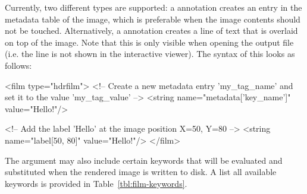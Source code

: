 Currently, two different types are supported: a  annotation
creates an entry in the metadata table of the image, which is preferable
when the image contents should not be touched. Alternatively, a 
annotation creates a line of text that is overlaid on top of the image. Note
that this is only visible when opening the output file (i.e. the line is not
shown in the interactive viewer).
The syntax of this looks as follows:

\begin{xml}
<film type="hdrfilm">
 <!-- Create a new metadata entry 'my_tag_name' and set it to the
      value 'my_tag_value' -->
 <string name="metadata['key_name']" value="Hello!"/>

 <!-- Add the label 'Hello' at the image position X=50, Y=80 -->
 <string name="label[50, 80]" value="Hello!"/>
</film>
\end{xml}

The  argument may also include certain keywords that will be
evaluated and substituted when the rendered image is written to disk. A list all available
keywords is provided in Table~\ref{tbl:film-keywords}.

